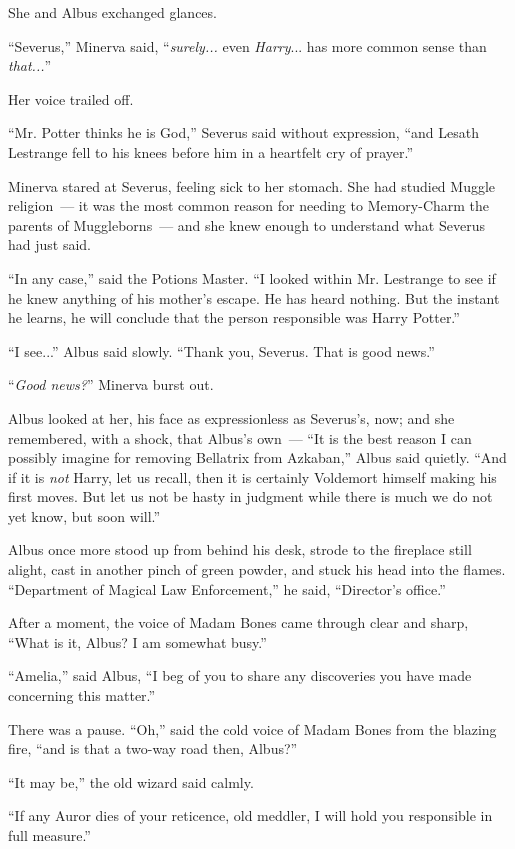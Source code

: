 She and Albus exchanged glances.

``Severus,'' Minerva said, ``\emph{surely...} even \emph{Harry}... has more common sense than \emph{that...}''

Her voice trailed off.

``Mr. Potter thinks he is God,'' Severus said without expression, ``and Lesath Lestrange fell to his knees before him in a heartfelt cry of prayer.''

Minerva stared at Severus, feeling sick to her stomach. She had studied Muggle religion~--- it was the most common reason for needing to Memory-Charm the parents of Muggleborns~--- and she knew enough to understand what Severus had just said.

``In any case,'' said the Potions Master. ``I looked within Mr. Lestrange to see if he knew anything of his mother's escape. He has heard nothing. But the instant he learns, he will conclude that the person responsible was Harry Potter.''

``I see...'' Albus said slowly. ``Thank you, Severus. That is good news.''

``\emph{Good news?}'' Minerva burst out.

Albus looked at her, his face as expressionless as Severus's, now; and she remembered, with a shock, that Albus's own~--- ``It is the best reason I can possibly imagine for removing Bellatrix from Azkaban,'' Albus said quietly. ``And if it is \emph{not} Harry, let us recall, then it is certainly Voldemort himself making his first moves. But let us not be hasty in judgment while there is much we do not yet know, but soon will.''

Albus once more stood up from behind his desk, strode to the fireplace still alight, cast in another pinch of green powder, and stuck his head into the flames. ``Department of Magical Law Enforcement,'' he said, ``Director's office.''

After a moment, the voice of Madam Bones came through clear and sharp, ``What is it, Albus? I am somewhat busy.''

``Amelia,'' said Albus, ``I beg of you to share any discoveries you have made concerning this matter.''

There was a pause. ``Oh,'' said the cold voice of Madam Bones from the blazing fire, ``and is that a two-way road then, Albus?''

``It may be,'' the old wizard said calmly.

``If any Auror dies of your reticence, old meddler, I will hold you responsible in full measure.''

